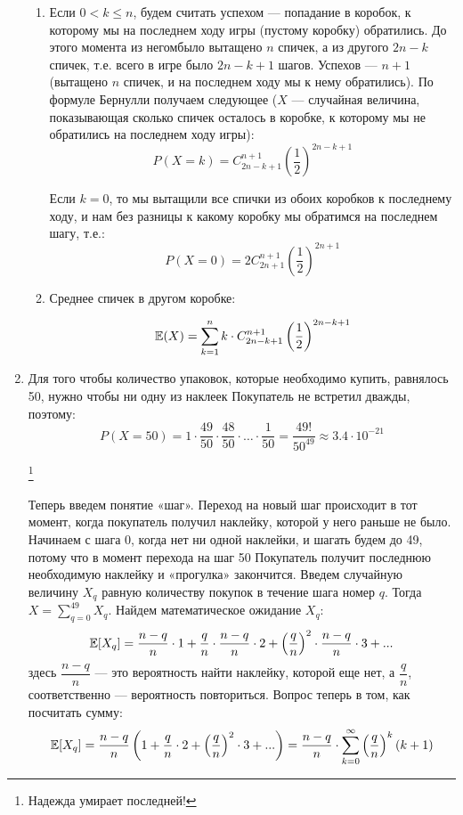 \documentclass[12pt, a4paper]{article}\usepackage[]{graphicx}\usepackage[]{color}
\begin{document}
\begin{enumerate}
\begin{enumerate}
\item Если $0<k \leqslant n$, будем считать успехом — попадание в коробок, к которому мы на последнем ходу игры (пустому коробку) обратились. До этого момента из негомбыло вытащено $n$ спичек, а из другого $2n-k$ спичек, т.е. всего в игре было $2n - k + 1$ шагов. Успехов — $n + 1$ (вытащено $n$ спичек, и на последнем ходу мы к нему обратились). По формуле Бернулли получаем следующее ($X$ — случайная величина, показывающая сколько спичек осталось в коробке, к которому мы не обратились на последнем ходу игры):
$$P(X = k) = C^{n+1}_{2n-k+1} \left(\dfrac{1}{2} \right)^{2n-k+1}$$

Если $k = 0$, то мы вытащили все спички из обоих коробков к последнему ходу, и нам без разницы к какому коробку мы обратимся на последнем шагу, т.е.:
$$P(X = 0) =2 C^{n+1}_{2n+1} \left(\dfrac{1}{2} \right)^{2n+1}$$

\item Среднее спичек в другом коробке:

$$\mathbb{E}(X) = \sum \limits_{k=1}^{n} k \cdot C^{n+1}_{2n-k+1} \left(\dfrac{1}{2} \right)^{2n-k+1}$$


\end{enumerate}


\item
Для того чтобы количество упаковок, которые необходимо купить, равнялось 50, нужно чтобы ни одну из наклеек Покупатель не встретил дважды, поэтому:
$$
P(X=50) = 1\cdot\frac{49}{50}\cdot\frac{48}{50}\cdot\dots\cdot\frac{1}{50} = \frac{49!}{50^{49}} \approx 3.4\cdot
10^{-21}$$ \vspace{-1cm}

\hspace{10.5cm}\footnote[2]{Надежда умирает последней!}

Теперь введем понятие «шаг». Переход на новый шаг происходит в тот момент, когда покупатель получил наклейку, которой у него раньше не было. Начинаем с шага 0, когда нет ни одной наклейки, и шагать будем до 49, потому что в момент перехода на шаг 50 Покупатель получит последнюю необходимую наклейку и «прогулка» закончится. Введем случайную величину $X_q$ равную количеству покупок в течение шага номер $q$. Тогда $X = \sum \limits_{q=0}^{49}X_q$.  Найдем математическое ожидание $X_q$:
$$
\mathbb{E}[X_q] = \frac{n-q}{n}\cdot 1 + \frac{q}{n}\cdot\frac{n-q}{n}\cdot 2 + \left(\frac{q}{n}\right)^2\cdot\frac{n-q}{n}\cdot 3 + ...
$$
здесь $\dfrac{n-q}{n}$ —  это вероятность найти наклейку, которой еще нет, а $\dfrac{q}{n}$, соответственно — вероятность повториться. Вопрос теперь в том, как посчитать сумму:
$$
\mathbb{E}[X_q] = \frac{n-q}{n}\left( 1 + \frac{q}{n}\cdot 2 + \left(\frac{q}{n}\right)^2 \cdot 3 + ...\right) = \frac{n-q}{n}\cdot\sum\limits_{k=0}^{\infty}\left(\frac{q}{n}\right)^k(k+1)
$$


\end{enumerate}
\end{document}
